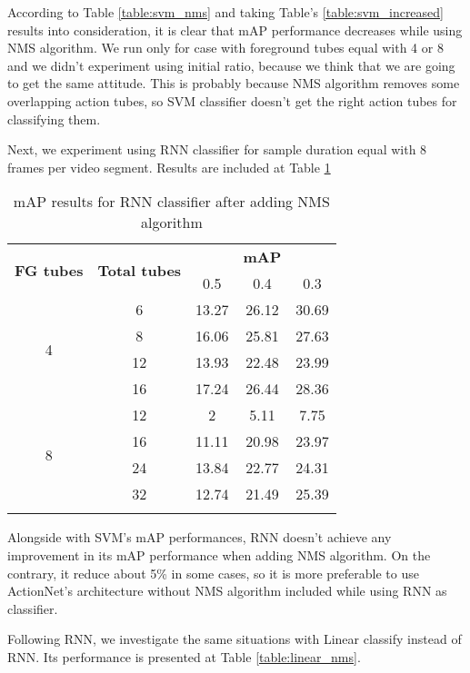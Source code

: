 According to Table \ref{table:svm_nms} and taking Table's \ref{table:svm_increased} results into consideration, it is clear that mAP performance decreases while using NMS algorithm.
We run only for case with foreground tubes equal with 4 or 8 and we didn't experiment using initial ratio, because we think that we are going to get the same attitude.
This is probably because NMS algorithm removes some overlapping action tubes, so SVM classifier doesn't get the right action tubes for classifying them. \par

Next, we experiment using RNN classifier for sample duration equal with 8 frames per video segment. Results are included at Table \ref{table:rnn_nms}

\begin{center}
  \begin{longtable}{|| c | c || c c c ||}
    \hline
    \multirow{2}{*}{\textbf{FG tubes}} & \multirow{2}{*}{\textbf{Total tubes}} & {} & \textbf{mAP} & {} \\
    {} & {} & 0.5 & 0.4 & 0.3 \\
    \hline
    \multirow{4}{*}{4} & 6 & 13.27 & 26.12 & 30.69  \\
    \cline{2-5}
    {} & 8 & 16.06 & 25.81 & 27.63 \\
    \cline{2-5}
    {} & 12 & 13.93 & 22.48 & 23.99 \\
    \cline{2-5}
    {} & 16 & 17.24 & 26.44 & 28.36 \\
    \hline
    \multirow{4}{*}{8} & 12 & 2 & 5.11 & 7.75 \\
    \cline{2-5}
    {} & 16 & 11.11 & 20.98 & 23.97 \\
    \cline{2-5}
    {} & 24 & 13.84 & 22.77 & 24.31 \\
    \cline{2-5}
    {} & 32 & 12.74 & 21.49 & 25.39 \\
    \hline

  \caption{mAP results for RNN classifier after adding NMS algorithm}
  \label{table:rnn_nms}
\end{longtable}
\end{center}

Alongside with SVM's mAP performances, RNN doesn't achieve any improvement in its mAP performance when adding NMS algorithm. On the contrary, it reduce about 5\% in some cases, so it is more
preferable to use ActionNet's architecture without NMS algorithm included while using RNN as classifier. \par
Following RNN, we investigate the same situations with Linear classify instead of RNN. Its performance is presented at Table \ref{table:linear_nms}.

